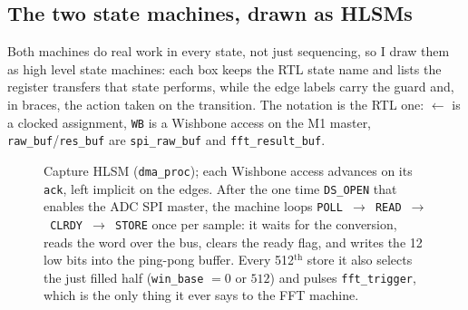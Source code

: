 \documentclass[a4paper,11pt]{article}
\begin{document}
\subsection{The two state machines, drawn as HLSMs}

Both machines do real work in every state, not just sequencing, so I draw them as
high level state machines: each box keeps the RTL state name and lists the
register transfers that state performs, while the edge labels carry the guard and,
in braces, the action taken on the transition. The notation is the RTL one:
$\leftarrow$ is a clocked assignment, \texttt{WB} is a Wishbone access on the M1
master, \texttt{raw\_buf}/\texttt{res\_buf} are \texttt{spi\_raw\_buf} and
\texttt{fft\_result\_buf}.

\begin{figure}[H]
\centering
{}
\caption{Capture HLSM (\texttt{dma\_proc}); each Wishbone access advances on its
\texttt{ack}, left implicit on the edges. After the one time \texttt{DS\_OPEN}
that enables the ADC SPI master, the machine loops
\texttt{POLL\,$\to$\,READ\,$\to$\,CLRDY\,$\to$\,STORE} once per sample: it waits
for the conversion, reads the word over the bus, clears the ready flag, and writes
the 12 low bits into the ping-pong buffer. Every 512$^{\text{th}}$ store it also
selects the just filled half (\texttt{win\_base} $=0$ or $512$) and pulses
\texttt{fft\_trigger}, which is the only thing it ever says to the FFT machine.}
\label{fig:capture-hlsm}
\end{figure}
\end{document}
